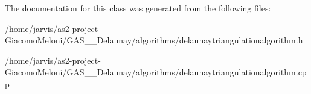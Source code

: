 The documentation for this class was generated from the following files\+:\begin{DoxyCompactItemize}
\item 
/home/jarvis/as2-\/project-\/\+Giacomo\+Meloni/\+G\+A\+S\+\_\+\_\+\+Delaunay/algorithms/delaunaytriangulationalgorithm.\+h\item 
/home/jarvis/as2-\/project-\/\+Giacomo\+Meloni/\+G\+A\+S\+\_\+\_\+\+Delaunay/algorithms/delaunaytriangulationalgorithm.\+cpp\end{DoxyCompactItemize}
